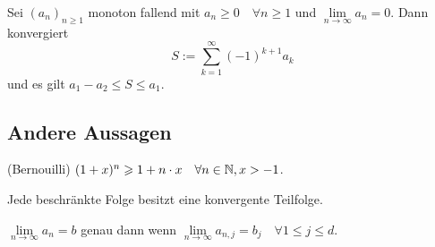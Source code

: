 \Satz[Alternating] Sei $\left(a_{n}\right)_{n \geqslant 1}$ monoton fallend mit $a_{n} \geqslant 0 \quad \forall n \geqslant 1$ und $\lim \limits_{n \rightarrow \infty} a_{n}=0 .$ Dann konvergiert 
$$S:=\sum_{k=1}^{\infty}(-1)^{k+1} a_{k}$$ und es gilt $a_{1}-a_{2} \leqslant S \leqslant a_{1}$.


\subsection{Andere Aussagen}
\Lemma (Bernouilli) $(1+x)^{n} \geqslant 1+n \cdot x \quad \forall n \in \mathbb{N}, x>-1$.

\Satz[Teilfolge] Jede beschränkte Folge besitzt eine konvergente Teilfolge.

\Satz[Vektorfolge] $\lim \limits_{n \rightarrow \infty} a_{n}=b$ genau dann wenn $\lim \limits_{n \rightarrow \infty} a_{n, j}=b_{j} \quad \forall 1 \leqslant j \leqslant d$.